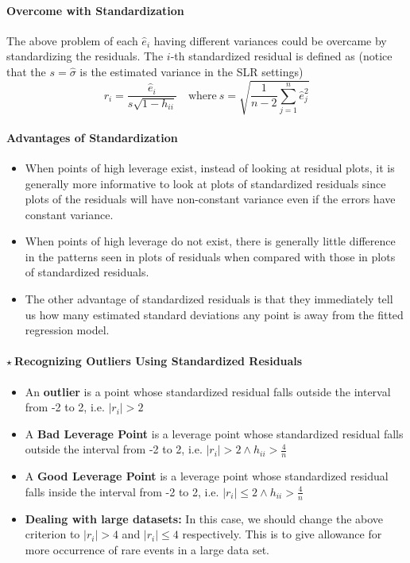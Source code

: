 \documentclass[11pt]{article}
\begin{document}
\paragraph{Overcome with Standardization} The above problem of each $\hat{e}_i$ having different variances could be overcame by standardizing the residuals. The $i$-th standardized residual is defined as (notice that the $s = \hat{\sigma}$ is the estimated variance in the SLR settings)
\begin{equation*}
    r_{i}=\frac{\hat{e}_{i}}{s \sqrt{1-h_{i i}}}\quad \text{where}~ s=\sqrt{\frac{1}{n-2} \sum_{j=1}^{n} \hat{e}_{j}^{2}}
\end{equation*}

\paragraph{Advantages of Standardization} 
\begin{itemize}
    \item When points of high leverage exist, instead of looking at residual plots, it is generally more informative to look at plots of standardized residuals since plots of the residuals will have non-constant variance even if the errors have constant variance.
    \item When points of high leverage do not exist, there is generally little difference in the patterns seen in plots of residuals when compared with those in plots of standardized residuals.
    \item The other advantage of standardized residuals is that they immediately tell us how many estimated standard deviations any point is away from the fitted regression model. 
\end{itemize}

\color{RawSienna}
\paragraph{$\star~$Recognizing Outliers Using Standardized Residuals} 
\begin{itemize}
    \item An \textbf{outlier} is a point whose standardized residual falls outside the interval from -2 to 2, i.e. $|r_i| > 2$
    \item A \textbf{Bad Leverage Point} is a leverage point whose standardized residual falls outside the interval from -2 to 2, i.e. $|r_i| > 2 \wedge h_{ii} > \frac{4}{n}$
    \item A \textbf{Good Leverage Point} is a leverage point whose standardized residual falls inside the interval from -2 to 2, i.e. $|r_i| \leq 2 \wedge h_{ii} > \frac{4}{n}$
    \item \textbf{Dealing with large datasets:} In this case, we should change the above criterion to $|r_i| > 4$ and $|r_i| \leq 4$ respectively. This is to give allowance for more occurrence of rare events in a large data set.
\end{itemize}
\color{Black}
\end{document}
